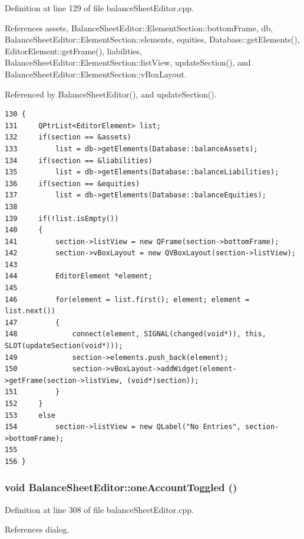 Definition at line 129 of file balance\-Sheet\-Editor.cpp.

References assets, Balance\-Sheet\-Editor::Element\-Section::bottom\-Frame, db, Balance\-Sheet\-Editor::Element\-Section::elements, equities, Database::get\-Elements(), Editor\-Element::get\-Frame(), liabilities, Balance\-Sheet\-Editor::Element\-Section::list\-View, update\-Section(), and Balance\-Sheet\-Editor::Element\-Section::v\-Box\-Layout.

Referenced by Balance\-Sheet\-Editor(), and update\-Section().

\footnotesize\begin{verbatim}130 {
131     QPtrList<EditorElement> list;
132     if(section == &assets)
133         list = db->getElements(Database::balanceAssets);
134     if(section == &liabilities)
135         list = db->getElements(Database::balanceLiabilities);
136     if(section == &equities)
137         list = db->getElements(Database::balanceEquities);
138     
139     if(!list.isEmpty())
140     {
141         section->listView = new QFrame(section->bottomFrame);
142         section->vBoxLayout = new QVBoxLayout(section->listView);
143         
144         EditorElement *element;
145         
146         for(element = list.first(); element; element = list.next())
147         {
148             connect(element, SIGNAL(changed(void*)), this, SLOT(updateSection(void*)));
149             section->elements.push_back(element);
150             section->vBoxLayout->addWidget(element->getFrame(section->listView, (void*)section));
151         }
152     }
153     else
154         section->listView = new QLabel("No Entries", section->bottomFrame);
155     
156 }
\end{verbatim}\normalsize 


\hypertarget{classBalanceSheetEditor_k5}{
\subsubsection[oneAccountToggled]{\setlength{\rightskip}{0pt plus 5cm}void Balance\-Sheet\-Editor::one\-Account\-Toggled ()}}
\label{classBalanceSheetEditor_k5}


Definition at line 308 of file balance\-Sheet\-Editor.cpp.

References dialog.

